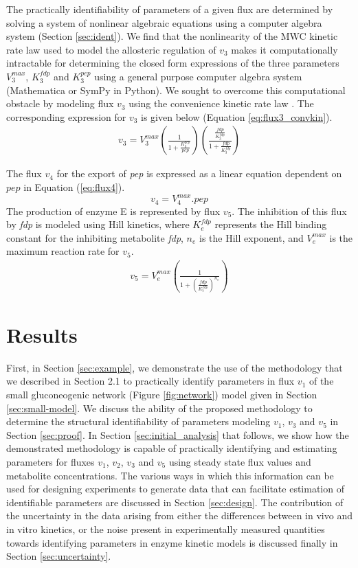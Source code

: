 \documentclass[10pt]{article}
\begin{document}
	The practically identifiability of parameters of a given flux are determined by solving a system of nonlinear algebraic equations using a computer algebra system (Section \ref{sec:ident}). We find that the nonlinearity of the MWC kinetic rate law used to model the allosteric regulation of $v_3$ makes it computationally intractable for determining the closed form expressions of the three parameters $V_3^{max}$, $K_3^{fdp}$ and $K_3^{pep}$ using a general purpose computer algebra system (Mathematica or SymPy in Python). We sought to overcome this computational obstacle by modeling flux $v_3$ using the convenience kinetic rate law \parencite{Liebermeister2006}. The corresponding expression for $v_3$ is given below (Equation \ref{eq:flux3_convkin}). 	
	\begin{align}\label{eq:flux3_convkin}
	v_3 = V_3^{max}\left(\frac{1}{1 + \frac{K_3^{pep}}{pep}}\right)\left(\frac{\frac{fdp}{K_3^{fdp}}}{1 + \frac{fdp}{K_3^{fdp}}}\right)
	\end{align}	
	
	The flux $v_4$ for the export of \textit{pep} is expressed as a linear equation dependent on $pep$ in Equation (\ref{eq:flux4}).
	\begin{equation}\label{eq:flux4}
	v_4 = V_{4}^{max}.pep
	\end{equation}		
	The production of enzyme E is represented by flux $v_5$. The inhibition of this flux by \textit{fdp} is modeled using Hill kinetics, where $K_e^{fdp}$ represents the Hill binding constant for the inhibiting metabolite \textit{fdp}, $n_e$ is the Hill exponent, and $V_e^{max}$ is the maximum reaction rate for $v_5$.
	\begin{align}\label{eq:flux5}
	v_5 = V_e^{max}\left(\frac{1}{1+\left(\frac{fdp}{K_{e}^{fdp}}\right)^{n_e}}\right)
	\end{align}
	
	\section{Results}
	First, in Section \ref{sec:example}, we demonstrate the use of the methodology that we described in Section 2.1 to practically identify parameters in flux $v_1$ of the small gluconeogenic network (Figure \ref{fig:network}) model given in Section \ref{sec:small-model}. 
	We discuss the ability of the proposed methodology to determine the structural identifiability of parameters modeling $v_1$, $v_3$ and $v_5$ in Section \ref{sec:proof}. 	
	In Section \ref{sec:initial_analysis} that follows, we show how the demonstrated methodology is capable of practically identifying and estimating parameters for fluxes $v_1$, $v_2$, $v_3$ and $v_5$ using steady state flux values and metabolite concentrations. 
	The various ways in which this information can be used for designing experiments to generate data that can facilitate estimation of identifiable parameters are discussed in Section \ref{sec:design}.
	The contribution of the uncertainty in the data arising from either the differences between in vivo and in vitro kinetics, or the noise present in experimentally measured quantities towards identifying parameters in enzyme kinetic models is discussed finally in Section \ref{sec:uncertainty}.
		
\end{document}
